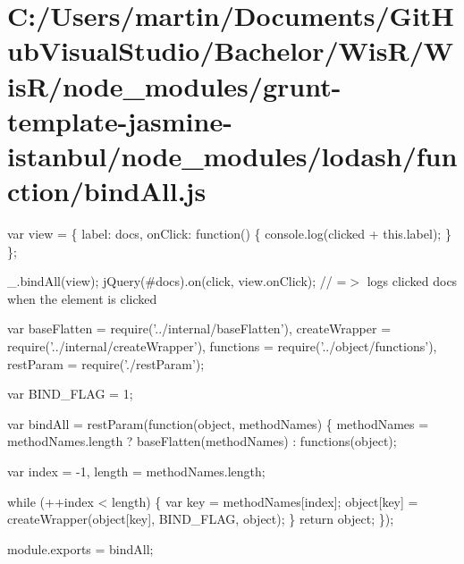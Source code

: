 \hypertarget{_c_1_2_users_2martin_2_documents_2_git_hub_visual_studio_2_bachelor_2_wis_r_2_wis_r_2node_module7bee99c55a0c9bedfedf9664b54826c7}{}\section{C\+:/\+Users/martin/\+Documents/\+Git\+Hub\+Visual\+Studio/\+Bachelor/\+Wis\+R/\+Wis\+R/node\+\_\+modules/grunt-\/template-\/jasmine-\/istanbul/node\+\_\+modules/lodash/function/bind\+All.\+js}
var view = \{ \textquotesingle{}label\textquotesingle{}\+: \textquotesingle{}docs\textquotesingle{}, \textquotesingle{}on\+Click\textquotesingle{}\+: function() \{ console.\+log(\textquotesingle{}clicked \textquotesingle{} + this.\+label); \} \};

\+\_\+.\+bind\+All(view); j\+Query(\textquotesingle{}\#docs\textquotesingle{}).on(\textquotesingle{}click\textquotesingle{}, view.\+on\+Click); // =$>$ logs \textquotesingle{}clicked docs\textquotesingle{} when the element is clicked


\begin{DoxyCodeInclude}
var baseFlatten = require(\textcolor{stringliteral}{'../internal/baseFlatten'}),
    createWrapper = require(\textcolor{stringliteral}{'../internal/createWrapper'}),
    functions = require(\textcolor{stringliteral}{'../object/functions'}),
    restParam = require(\textcolor{stringliteral}{'./restParam'});

var BIND\_FLAG = 1;

var bindAll = restParam(\textcolor{keyword}{function}(\textcolor{keywordtype}{object}, methodNames) \{
  methodNames = methodNames.length ? baseFlatten(methodNames) : functions(object);

  var index = -1,
      length = methodNames.length;

  \textcolor{keywordflow}{while} (++index < length) \{
    var key = methodNames[index];
    \textcolor{keywordtype}{object}[key] = createWrapper(\textcolor{keywordtype}{object}[key], BIND\_FLAG, \textcolor{keywordtype}{object});
  \}
  \textcolor{keywordflow}{return} object;
\});

module.exports = bindAll;
\end{DoxyCodeInclude}
 